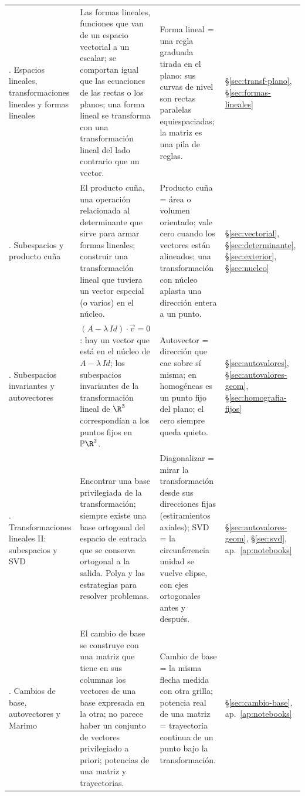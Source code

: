 {\begin{longtable}{>{\raggedright\arraybackslash}p{20mm}>{\raggedright\arraybackslash}p{60mm}>{\raggedright\arraybackslash}p{44mm}>{\raggedright\arraybackslash}p{28mm}}
4. Espacios lineales, transformaciones lineales y formas lineales &
Las formas lineales, funciones que van de un espacio vectorial a un escalar; se
comportan igual que las ecuaciones de las rectas o los planos; una forma lineal se
transforma con una transformación lineal del lado contrario que un vector. &
Forma lineal = una regla graduada tirada en el plano: sus curvas de nivel son rectas
paralelas equiespaciadas; la matriz es una pila de reglas. &
\S\ref{sec:transf-plano}, \S\ref{sec:formas-lineales}\\
5. Subespacios y producto cuña &
El producto cuña, una operación relacionada al determinante que sirve para armar formas
lineales; construir una transformación lineal que tuviera un vector especial (o varios)
en el núcleo. &
Producto cuña = área o volumen orientado; vale cero cuando los vectores están alineados;
una transformación con núcleo aplasta una dirección entera a un punto. &
\S\ref{sec:vectorial}, \S\ref{sec:determinante}, \S\ref{sec:exterior}, \S\ref{sec:nucleo}\\
6. Subespacios invariantes y autovectores &
\((A-\lambda\,Id)\cdot\vec v=0\): hay un vector que está en el núcleo de
\(A-\lambda\,Id\); los subespacios invariantes de la transformación lineal de
\(\R^3\) correspondían a los puntos fijos en \(\mathbb{P}\R^2\). &
Autovector = dirección que cae sobre sí misma; en homogéneas es un punto fijo del plano;
el cero siempre queda quieto. &
\S\ref{sec:autovalores}, \S\ref{sec:autovalores-geom}, \S\ref{sec:homografia-fijos}\\
7. Transformaciones lineales II: subespacios y SVD &
Encontrar una base privilegiada de la transformación; siempre existe una base
ortogonal del espacio de entrada que se conserva ortogonal a la salida. Polya y las
estrategias para resolver problemas. &
Diagonalizar = mirar la transformación desde sus direcciones fijas (estiramientos
axiales); SVD = la circunferencia unidad se vuelve elipse, con ejes ortogonales antes y
después. &
\S\ref{sec:autovalores-geom}, \S\ref{sec:svd}, ap.~\ref{ap:notebooks}\\
8. Cambios de base, autovectores y Marimo &
El cambio de base se construye con una matriz que tiene en sus columnas los vectores de
una base expresada en la otra; no parece haber un conjunto de vectores privilegiado
a priori; potencias de una matriz y trayectorias. &
Cambio de base = la misma flecha medida con otra grilla; potencia real de una matriz =
trayectoria continua de un punto bajo la transformación. &
\S\ref{sec:cambio-base}, ap.~\ref{ap:notebooks}\\

\end{longtable}}

